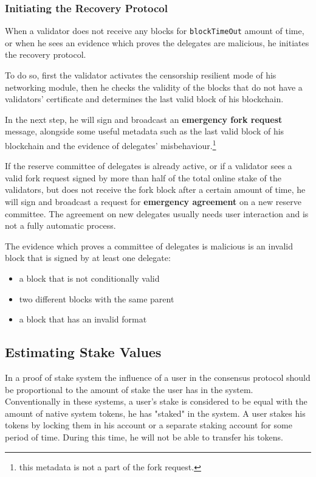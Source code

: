 \subsubsection{Initiating the Recovery Protocol}

When a validator does not receive any blocks for \texttt{blockTimeOut} amount of time, or when he sees an
evidence which proves the delegates are malicious, he initiates the recovery protocol.

To do so, first the validator activates the censorship resilient mode of his networking module, then he checks the
validity of the blocks that do not have a validators' certificate and determines the
last valid block of his blockchain.

In the next step, he will sign and broadcast an \textbf{emergency fork request} message, alongside some useful metadata
such as the last valid block of his blockchain and the evidence of delegates' misbehaviour.\footnote{this metadata is
not a part of the fork request.}

If the reserve committee of delegates is already active, or if a validator sees a valid fork request signed
by more than half of the total online stake of the validators, but does not receive the fork
block after a certain amount of time, he will sign and broadcast a request for
\textbf{emergency agreement} on a new reserve committee. The agreement on new delegates usually needs user
interaction and is not a fully automatic process.

The evidence which proves a committee of delegates is malicious is an invalid block that is signed by at least
one delegate:
\begin{itemize}
    \item a block that is not conditionally valid
    \item two different blocks with the same parent
    \item a block that has an invalid format
\end{itemize}

\subsection{Estimating Stake Values}\label{subsec:user's-stake}

In a proof of stake system the influence of a user in the consensus protocol should be proportional to the amount
of stake the user has in the system. Conventionally in these systems, a user's stake is considered to be equal with the
amount of native system tokens, he has "staked" in the system. A user stakes his tokens by locking them in
his account or a separate staking account for some period of time. During this time, he will not be able to transfer
his tokens.

